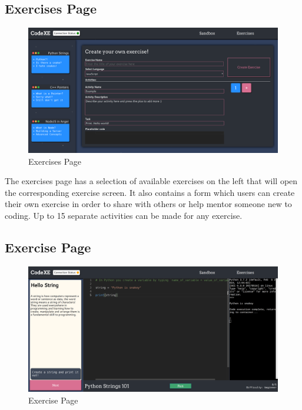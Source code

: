 \subsection{Exercises Page} \label{impl-exercises-page}

\begin{figure}[h!]
    \centering
    \includegraphics[width=\linewidth]{res/exercises_page.png}
    \caption{Exercises Page}
    \label{fig:exercisespage}
\end{figure}

The exercises page has a selection of available exercises on the left that will open the corresponding exercise screen. It also contains a form which users can create their own exercise in order to share with others or help mentor someone new to coding. Up to 15 separate activities can be made for any exercise.

\subsection{Exercise Page} \label{impl-exercise-page}

\begin{figure}[h!]
\centering
    \includegraphics[width=\linewidth]{res/exercise_page.png}
    \caption{Exercise Page}
    \label{fig:exercisepage}
\end{figure}

